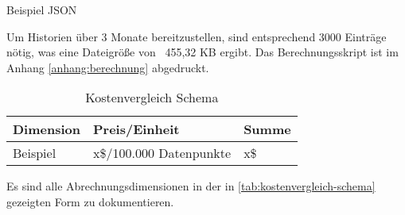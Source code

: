 \begin{listing}[H]
\inputminted[frame=lines,breaklines=true]{json}{code/estimates/filtered-estimate.json}
\caption[Beispiel JSON]{Beispiel \ac{JSON}}
\label{listing:json}
\end{listing}
Um Historien über 3 Monate bereitzustellen, sind entsprechend 3000 Einträge nötig, was eine Dateigröße von ~455,32 KB ergibt. Das Berechnungsskript ist im Anhang \ref{anhang:berechnung} abgedruckt.


\begin{table}[H]
\centering
\begin{tabular}{|l|l|l|}
\hline
Dimension & Preis/Einheit           & Summe \\ \hline
Beispiel  & x\$/100.000 Datenpunkte & x\$  \\\hline
\end{tabular}
\caption{Kostenvergleich Schema}
\label{tab:kostenvergleich-schema}
\end{table}
Es sind alle Abrechnungsdimensionen in der in \autoref{tab:kostenvergleich-schema} gezeigten Form zu dokumentieren.
